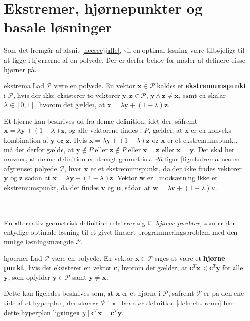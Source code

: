 \section{Ekstremer, hjørnepunkter og basale løsninger}
%
Som det fremgår af afsnit \ref{heeeeejjulle}, vil en optimal løsning være tilbøjelige til at ligge i hjørnerne af en polyede.
Der er derfor behov for måder at definere disse hjørner på.
%
\begin{defn}{}{ekstrema}
Lad $\mathcal{P}$ være en polyede. 
En vektor $\mathbf{x} \in \mathcal{P}$ kaldes et \textbf{ekstremumspunkt} i $\mathcal{P}$, hvis der ikke eksisterer to vektorer $\mathbf{y},\mathbf{z} \in \mathcal{P}$, $\mathbf{y} \land \mathbf{z} \neq \mathbf{x}$, 
samt en skalar $\lambda \in [0,1]$, hvorom det gælder, at $\mathbf{x}=\lambda\mathbf{y}+(1-\lambda)\textbf{z}$.
\end{defn}
\noindent
%
%
Et hjørne kan beskrives ud fra denne definition, idet der, såfremt $\mathbf{x}=\lambda\mathbf{y}+(1-\lambda) \mathbf{z}$, og alle vektorene findes i $P$, gælder, at $\mathbf{x}$ er en konveks kombination af $\mathbf{y}$ og $\mathbf{z}$.
Hvis $\mathbf{x}=\lambda\mathbf{y}+(1-\lambda) \textbf{z}$ og $\mathbf{x}$ er et ekstremumspunkt, må det derfor gælde, at $\mathbf{y}\notin P$ eller $\mathbf{z}\notin P$ eller $\mathbf{x}=\mathbf{z}$ eller $\mathbf{x}=\mathbf{y}$. 
Det skal her nævnes, at denne definition er strengt geometrisk. 
På figur \ref{fig:ekstrema} ses en afgrænset polyede $\mathcal{P}$, hvor $\textbf{x}$ er et ekstremumspunkt, da der ikke findes vektorer $\textbf{y}$ og $\textbf{z}$ sådan at $\mathbf{x}=\lambda\mathbf{y}+(1-\lambda) \mathbf{z}$. Vektor $\textbf{w}$ er i modsætning ikke et ekstremumspunkt, da der findes $\textbf{v}$ og $\textbf{u}$, sådan at $\mathbf{w}=\lambda\mathbf{v}+(1-\lambda)u$.
%

\\\\
%
En alternativ geometrisk definition relaterer sig til \textit{hjørne punkter}, som er den entydige optimale løsning til et givet lineært programmeringsproblem med den mulige løsningsmængde $\mathcal{P}$.
%
\begin{defn}{}{hjoerner}
Lad $\mathcal{P}$ være en polyede. 
En vektor $\mathbf{x}\in \mathcal{P}$ siges at være et \textbf{hjørne punkt}, hvis der eksisterer en vektor $\mathbf{c}$, hvorom det gælder, at $\mathbf{c}^T\mathbf{x}<\mathbf{c}^T\mathbf{y}$ for alle $\mathbf{y}$, som opfylder $\mathbf{y} \in \mathcal{P}$ samt $\mathbf{y}\neq\mathbf{x}$.
\end{defn}
\noindent
%
%
Dette kan ligeledes beskrives som, at $\mathbf{x}$ er et hjørne i $\mathcal{P}$, såfremt $\mathcal{P}$ er på den ene side af et hyperplan, der skærer $\mathcal{P}$ i $\mathbf{x}$. 
Jævnfør definition \ref{defn:ekstrema} har dette hyperplan ligningen $y \mid \mathbf{c}^T\mathbf{x}=\mathbf{c}^T\mathbf{y}.$